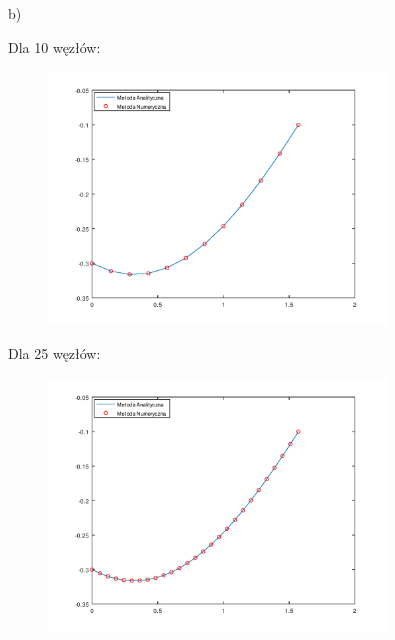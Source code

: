 \newpage
b)\\
\begin{samepage}
    Dla 10 węzłów:    

    \FloatBarrier
    \begin{figure}[!ht]
        \begin{center}
            \includegraphics[width=0.8\textwidth]{Lab4/charts/zad2/zad2_n_10.png}
        \end{center}
    \end{figure}
    \FloatBarrier
\end{samepage}

\begin{samepage}
    Dla 25 węzłów:
    \begin{figure}[!ht]
        \begin{center}
            \includegraphics[width=0.8\textwidth]{Lab4/charts/zad2/zad2_n_25.png}
        \end{center}
    \end{figure}
    \FloatBarrier
\end{samepage}


